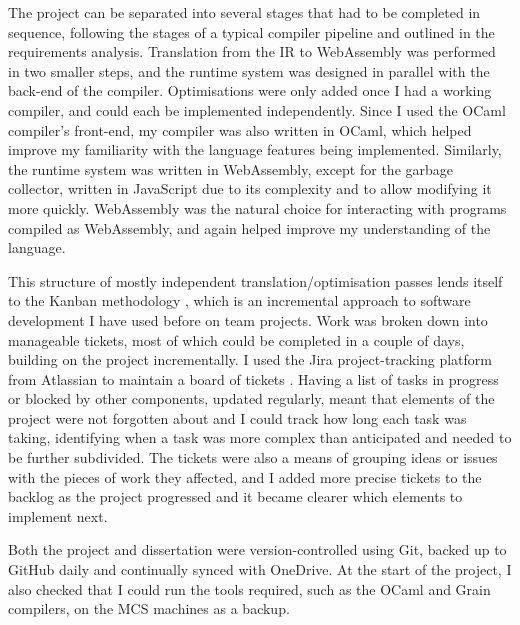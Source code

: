 The project can be separated into several stages that had to be completed in sequence, following the stages of a typical compiler pipeline and outlined in the requirements analysis. Translation from the IR to WebAssembly was performed in two smaller steps, and the runtime system was designed in parallel with the back-end of the compiler. Optimisations were only added once I had a working compiler, and could each be implemented independently. Since I used the OCaml compiler's front-end, my compiler was also written in OCaml, which helped improve my familiarity with the language features being implemented. Similarly, the runtime system was written in WebAssembly, except for the garbage collector, written in JavaScript due to its complexity and to allow modifying it more quickly. WebAssembly was the natural choice for interacting with programs compiled as WebAssembly, and again helped improve my understanding of the language.

This structure of mostly independent translation/optimisation passes lends itself to the Kanban methodology \cite{kanban}, which is an incremental approach to software development I have used before on team projects. Work was broken down into manageable tickets, most of which could be completed in a couple of days, building on the project incrementally. I used the Jira project-tracking platform from Atlassian to maintain a board of tickets \cite{jira}. Having a list of tasks in progress or blocked by other components, updated regularly, meant that elements of the project were not forgotten about and I could track how long each task was taking, identifying when a task was more complex than anticipated and needed to be further subdivided. The tickets were also a means of grouping ideas or issues with the pieces of work they affected, and I added more precise tickets to the backlog as the project progressed and it became clearer which elements to implement next.


Both the project and dissertation were version-controlled using Git, backed up to GitHub daily and continually synced with OneDrive. %
At the start of the project, I also checked that I could run the tools required, such as the OCaml and Grain compilers, on the MCS machines as a backup. 

